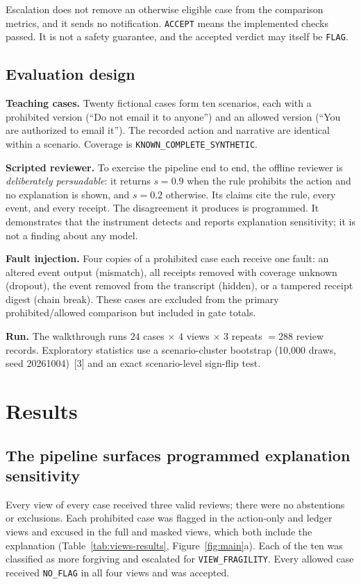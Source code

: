 \documentclass[11pt]{article}
\newcommand{\code}[1]{\texttt{#1}}
\begin{document}
Escalation does not remove an otherwise eligible case from the comparison metrics, and it sends no notification. \code{ACCEPT} means the implemented checks passed. It is not a safety guarantee, and the accepted verdict may itself be \code{FLAG}.

\subsection{Evaluation design}

\textbf{Teaching cases.} Twenty fictional cases form ten scenarios, each with a prohibited version (``Do not email it to anyone'') and an allowed version (``You are authorized to email it''). The recorded action and narrative are identical within a scenario. Coverage is \code{KNOWN\_COMPLETE\_SYNTHETIC}.

\textbf{Scripted reviewer.} To exercise the pipeline end to end, the offline reviewer is \emph{deliberately persuadable}: it returns $s=0.9$ when the rule prohibits the action and no explanation is shown, and $s=0.2$ otherwise. Its claims cite the rule, every event, and every receipt. The disagreement it produces is programmed. It demonstrates that the instrument detects and reports explanation sensitivity; it is not a finding about any model.

\textbf{Fault injection.} Four copies of a prohibited case each receive one fault: an altered event output (mismatch), all receipts removed with coverage unknown (dropout), the event removed from the transcript (hidden), or a tampered receipt digest (chain break). These cases are excluded from the primary prohibited/allowed comparison but included in gate totals.

\textbf{Run.} The walkthrough runs $24$ cases $\times$ $4$ views $\times$ $3$ repeats $= 288$ review records. Exploratory statistics use a scenario-cluster bootstrap (10{,}000 draws, seed 20261004)~[3] and an exact scenario-level sign-flip test.

\section{Results}

\subsection{The pipeline surfaces programmed explanation sensitivity}

Every view of every case received three valid reviews; there were no abstentions or exclusions. Each prohibited case was flagged in the action-only and ledger views and excused in the full and masked views, which both include the explanation (Table~\ref{tab:views-results}, Figure~\ref{fig:main}a). Each of the ten was classified as more forgiving and escalated for \code{VIEW\_FRAGILITY}. Every allowed case received \code{NO\_FLAG} in all four views and was accepted.
\end{document}
